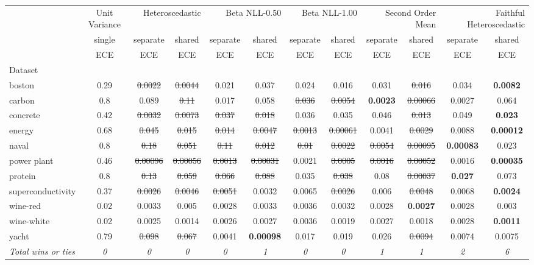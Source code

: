 \begin{tabular}{l|c|cc|cc|cc|cc|cc}
\toprule
{} & {Unit Variance} & \multicolumn{2}{r}{Heteroscedastic} & \multicolumn{2}{r}{Beta NLL-0.50} & \multicolumn{2}{r}{Beta NLL-1.00} & \multicolumn{2}{r}{Second Order Mean} & \multicolumn{2}{r}{Faithful Heteroscedastic} \\
{} & {single} & {separate} & {shared} & {separate} & {shared} & {separate} & {shared} & {separate} & {shared} & {separate} & {shared} \\
{} & {ECE} & {ECE} & {ECE} & {ECE} & {ECE} & {ECE} & {ECE} & {ECE} & {ECE} & {ECE} & {ECE} \\
{Dataset} & {} & {} & {} & {} & {} & {} & {} & {} & {} & {} & {} \\
\midrule
boston & 0.29 & \sout{0.0022} & \sout{0.0044} & 0.021 & 0.037 & 0.024 & 0.016 & 0.031 & \sout{0.016} & 0.034 & \textbf{0.0082} \\
carbon & 0.8 & 0.089 & \sout{0.11} & 0.017 & 0.058 & \sout{0.036} & \sout{0.0054} & \textbf{0.0023} & \sout{0.00066} & 0.0027 & 0.064 \\
concrete & 0.42 & \sout{0.0032} & \sout{0.0073} & \sout{0.037} & \sout{0.018} & 0.036 & 0.035 & 0.046 & \sout{0.013} & 0.049 & \textbf{0.023} \\
energy & 0.68 & \sout{0.045} & \sout{0.015} & \sout{0.014} & \sout{0.0047} & \sout{0.0013} & \sout{0.00061} & 0.0041 & \sout{0.0029} & 0.0088 & \textbf{0.00012} \\
naval & 0.8 & \sout{0.18} & \sout{0.051} & \sout{0.11} & \sout{0.012} & \sout{0.01} & \sout{0.0022} & \sout{0.0054} & \sout{0.00095} & \textbf{0.00083} & 0.023 \\
power plant & 0.46 & \sout{0.00096} & \sout{0.00056} & \sout{0.0013} & \sout{0.00031} & 0.0021 & \sout{0.0005} & \sout{0.0016} & \sout{0.00052} & 0.0016 & \textbf{0.00035} \\
protein & 0.8 & \sout{0.13} & \sout{0.059} & \sout{0.066} & \sout{0.088} & 0.035 & \sout{0.038} & 0.08 & \sout{0.00037} & \textbf{0.027} & 0.073 \\
superconductivity & 0.37 & \sout{0.0026} & \sout{0.0046} & \sout{0.0051} & 0.0032 & 0.0065 & \sout{0.0026} & 0.006 & \sout{0.0048} & 0.0068 & \textbf{0.0024} \\
wine-red & 0.02 & 0.0033 & 0.005 & 0.0028 & 0.0033 & 0.0036 & 0.0032 & 0.0028 & \textbf{0.0027} & 0.0028 & 0.003 \\
wine-white & 0.02 & 0.0025 & 0.0014 & 0.0026 & 0.0027 & 0.0036 & 0.0019 & 0.0027 & 0.0018 & 0.0028 & \textbf{0.0011} \\
yacht & 0.79 & \sout{0.098} & \sout{0.067} & 0.0041 & \textbf{0.00098} & 0.017 & 0.019 & 0.026 & \sout{0.0094} & 0.0074 & 0.0075 \\
\textit{{Total wins or ties}} & \textit{0} & \textit{0} & \textit{0} & \textit{0} & \textit{1} & \textit{0} & \textit{0} & \textit{1} & \textit{1} & \textit{2} & \textit{6} \\
\bottomrule
\end{tabular}
